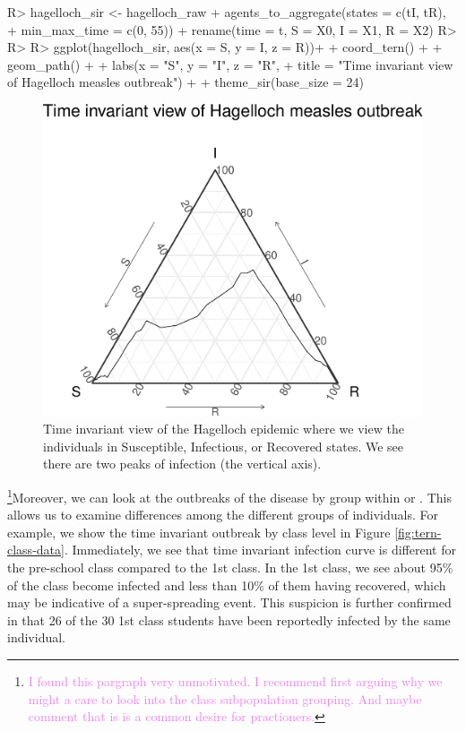 \documentclass[
  shortnames]{jss}
\begin{document}
\begin{CodeChunk}
\begin{CodeInput}
R> hagelloch_sir <- hagelloch_raw %
+   agents_to_aggregate(states = c(tI, tR),
+                       min_max_time = c(0, 55)) %
+   rename(time = t, S = X0, I = X1, R = X2)
R> 
R> 
R> ggplot(hagelloch_sir, aes(x = S, y = I, z = R))+
+   coord_tern() +
+   geom_path() +
+   labs(x = "S", y = "I", z = "R",
+        title = "Time invariant view of Hagelloch measles outbreak") + 
+   theme_sir(base_size = 24)
\end{CodeInput}
\begin{figure}[H]

{\centering \includegraphics{Figs/unnamed-chunk-24-1} 

}

\caption{\label{fig:hag-tern-raw}Time invariant view of the Hagelloch epidemic where we view the individuals in Susceptible, Infectious, or Recovered states.  We see there are two peaks of infection (the vertical axis).}\label{fig:unnamed-chunk-24}
\end{figure}
\end{CodeChunk}

\footnote{\textcolor{violet}{I found this pargraph very unmotivated. I recommend first arguing why we might a care to look into the class subpopulation grouping. And maybe comment that is is a common desire for practioners.}}Moreover,
we can look at the outbreaks of the disease by group within
 or . This allows us
to examine differences among the different groups of individuals. For
example, we show the time invariant outbreak by class level in Figure
\ref{fig:tern-class-data}. Immediately, we see that time invariant
infection curve is different for the pre-school class compared to the
1st class. In the 1st class, we see about 95\% of the class become
infected and less than 10\% of them having recovered, which may be
indicative of a super-spreading event. This suspicion is further
confirmed in that 26 of the 30 1st class students have been reportedly
infected by the same individual.
\end{document}
